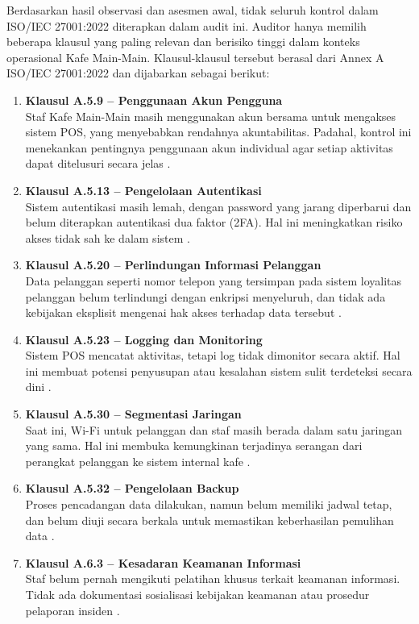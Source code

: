 \documentclass[12pt, a4paper]{report}
\begin{document}
Berdasarkan hasil observasi dan asesmen awal, tidak seluruh kontrol dalam ISO/IEC 27001:2022 diterapkan dalam audit ini. Auditor hanya memilih beberapa klausul yang paling relevan dan berisiko tinggi dalam konteks operasional Kafe Main-Main. Klausul-klausul tersebut berasal dari Annex A ISO/IEC 27001:2022 dan dijabarkan sebagai berikut:

\begin{enumerate}
    \item \textbf{Klausul A.5.9 – Penggunaan Akun Pengguna} \\
    Staf Kafe Main-Main masih menggunakan akun bersama untuk mengakses sistem POS, yang menyebabkan rendahnya akuntabilitas. Padahal, kontrol ini menekankan pentingnya penggunaan akun individual agar setiap aktivitas dapat ditelusuri secara jelas \cite{widodo2022keamanan}.

    \item \textbf{Klausul A.5.13 – Pengelolaan Autentikasi} \\
    Sistem autentikasi masih lemah, dengan password yang jarang diperbarui dan belum diterapkan autentikasi dua faktor (2FA). Hal ini meningkatkan risiko akses tidak sah ke dalam sistem \cite{rijal2022iso}.

    \item \textbf{Klausul A.5.20 – Perlindungan Informasi Pelanggan} \\
    Data pelanggan seperti nomor telepon yang tersimpan pada sistem loyalitas pelanggan belum terlindungi dengan enkripsi menyeluruh, dan tidak ada kebijakan eksplisit mengenai hak akses terhadap data tersebut \cite{ratnasari2021penerapan}.

    \item \textbf{Klausul A.5.23 – Logging dan Monitoring} \\
    Sistem POS mencatat aktivitas, tetapi log tidak dimonitor secara aktif. Hal ini membuat potensi penyusupan atau kesalahan sistem sulit terdeteksi secara dini \cite{sari2023backup}.

    \item \textbf{Klausul A.5.30 – Segmentasi Jaringan} \\
    Saat ini, Wi-Fi untuk pelanggan dan staf masih berada dalam satu jaringan yang sama. Hal ini membuka kemungkinan terjadinya serangan dari perangkat pelanggan ke sistem internal kafe \cite{haryanto2021wifi}.

    \item \textbf{Klausul A.5.32 – Pengelolaan Backup} \\
    Proses pencadangan data dilakukan, namun belum memiliki jadwal tetap, dan belum diuji secara berkala untuk memastikan keberhasilan pemulihan data \cite{sari2023backup}.

    \item \textbf{Klausul A.6.3 – Kesadaran Keamanan Informasi} \\
    Staf belum pernah mengikuti pelatihan khusus terkait keamanan informasi. Tidak ada dokumentasi sosialisasi kebijakan keamanan atau prosedur pelaporan insiden \cite{pratama2022pelatihan}.
\end{enumerate}
\end{document}

